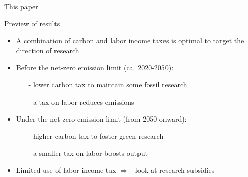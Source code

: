 \documentclass[11pt,aspectratio=169]{beamer}
\newcommand{\tr}[1]{\textcolor{blue}{#1}}
\newcommand{\ar}{$\Rightarrow$ \ }
\begin{document}
\begin{frame}{This paper}
{\begin{tikzpicture}
		\end{tikzpicture}
	}
	\end{frame}
	
	
	\begin{frame}{Preview of results}
		\centering
		\vspace{-3mm}
		\begin{itemize}[<+-| alert@+>]
			\item A combination of carbon and labor income taxes is optimal to target the direction of research
			\vspace{3mm}
			\item Before the net-zero emission limit (ca. 2020-2050): 
			\begin{itemize}
				\item[-] lower carbon tax to maintain some fossil research %
				\item[-] a tax on labor reduces emissions
			\end{itemize}
			\vspace{3mm}
			\item Under the net-zero emission limit (from 2050 onward): 
			\begin{itemize}
				\item[-]  higher carbon tax to foster green research
				\item[-]  a smaller tax on labor boosts output
			\end{itemize}
			\vspace{3mm}
			\item Limited use of labor income tax \ar look at research subsidies
	\end{itemize}
\end{frame}
\end{document}
